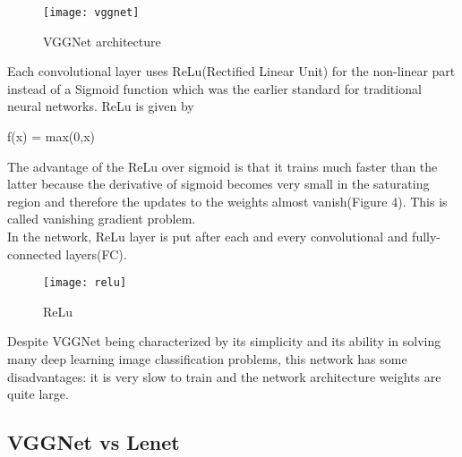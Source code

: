 \documentclass[../main.tex]{subfiles}
\begin{document}
\begin{figure}[htbp] 
\centering 
\texttt{[image: vggnet]}
\caption{VGGNet architecture \cite{vggnet}} 
\label{vggnet} 
\end{figure} 

Each convolutional layer uses ReLu(Rectified Linear Unit) for the non-linear part instead of a Sigmoid function which was the earlier standard for traditional neural networks. ReLu is given by 

f(x) = max(0,x)

The advantage of the ReLu over sigmoid is that it trains much faster than the latter because the derivative of sigmoid becomes very small in the saturating region and therefore the updates to the weights almost vanish(Figure 4). This is called vanishing gradient problem.\\
In the network, ReLu layer is put after each and every convolutional and fully-connected layers(FC).

\begin{figure}[htbp] 
\centering 
\texttt{[image: relu]}
\caption{ReLu} 
\label{relu} 
\end{figure}

Despite VGGNet being characterized by its simplicity and its ability in solving many deep learning image classification problems, this network has some disadvantages: it is very slow to train and the network architecture weights are quite large.\cite{vgg}

\subsection{VGGNet vs Lenet}

\vspace{5mm}
\end{document}
